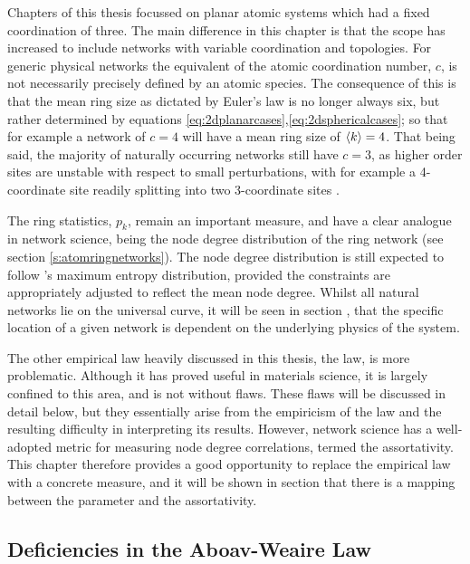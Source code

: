 Chapters  of this thesis focussed on planar atomic systems which had a fixed coordination of three.
The main difference in this chapter is that the scope has increased to include networks with variable coordination and topologies.
For generic physical networks the equivalent of the atomic coordination number, $c$, is not necessarily precisely defined by an atomic species. 
The consequence of this is that the mean ring size as dictated by Euler's law is no longer always six, but rather determined by equations \eqref{eq:2dplanarcases},\eqref{eq:2dsphericalcases}; so that for example a network of $c=4$ will have a mean ring size of $\langle k \rangle=4$.
That being said, the majority of naturally occurring networks still have $c=3$, as higher order sites are unstable with respect to small perturbations, with for example a 4\--coordinate site readily splitting into two 3\--coordinate sites \cite{Caer1993}.

The ring statistics, $p_k$, remain an important measure, and have a clear analogue in network science, being the node degree distribution of the ring network (see section \ref{s:atomringnetworks}).
The node degree distribution is still expected to follow \lm's maximum entropy distribution, provided the constraints are appropriately adjusted to reflect the mean node degree.
Whilst all natural networks lie on the universal \lm{} curve, it will be seen in section , that the specific location of a given network is dependent on the underlying physics of the system.

The other empirical law heavily discussed in this thesis, the \aw{} law, is more problematic.
Although it has proved useful in materials science, it is largely confined to this area, and is not without flaws.
These flaws will be discussed in detail below, but they essentially arise from the empiricism of the law and the resulting difficulty in interpreting its results.
However, network science has a well\--adopted metric for measuring node degree correlations, termed the assortativity.  
This chapter therefore provides a good opportunity to replace the empirical \aw{} law with a concrete measure, and it will be shown in section  that there is a mapping between the \aw{} parameter and the assortativity.

\subsection{Deficiencies in the Aboav\--Weaire Law}

